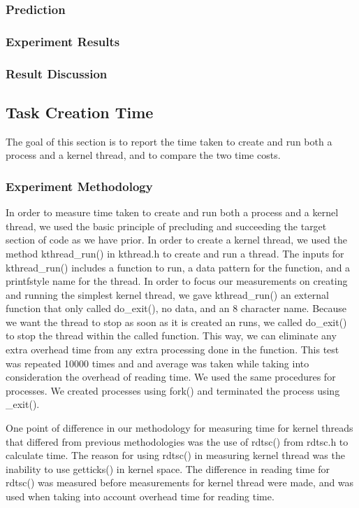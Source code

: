 \documentclass{article} %
\begin{document}
\subsubsection{Prediction}
\subsubsection{Experiment Results}
\subsubsection{Result Discussion}

\subsection{Task Creation Time}
The goal of this section is to report the time taken to create and run both a process and a kernel thread, and to compare the two time costs.  

\subsubsection{Experiment Methodology}
In order to measure time taken to create and run both a process and a kernel thread, we used the basic principle of precluding and succeeding the target section of code as we have prior. In order to create a kernel thread, we used the method kthread\_run() in kthread.h to create and run a thread. The inputs for kthread\_run() includes a function to run, a data pattern for the function, and a printf\-style name for the thread. In order to focus our measurements on creating and running the simplest kernel thread, we gave kthread\_run() an external function that only called do\_exit(), no data, and an 8 character name. Because we want the thread to stop as soon as it is created an runs, we called do\_exit() to stop the thread within the called function. This way, we can eliminate any extra overhead time from any extra processing done in the function. This test was repeated 10000 times and and average was taken while taking into consideration the overhead of reading time. We used the same procedures for processes. We created processes using fork() and terminated the process using \_exit().

One point of difference in our methodology for measuring time for kernel threads that differed from previous methodologies was the use of rdtsc() from rdtsc.h to calculate time. The reason for using rdtsc() in measuring kernel thread was the inability to use getticks() in kernel space. The difference in reading time for rdtsc() was measured before measurements for kernel thread were made, and was used when taking into account overhead time for reading time. 
\end{document}
